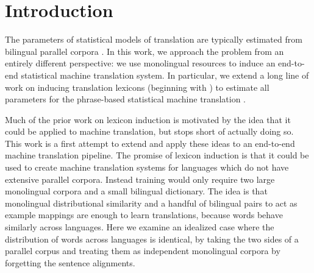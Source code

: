 \documentclass[11pt]{article}
\newcommand{\mnote}[1]{\marginpar{%
  \vskip-\baselineskip
  \raggedright\footnotesize
  \itshape\hrule\smallskip\tiny{#1}\par\smallskip\hrule}}
\newcommand{\mtodo}[1]{\mnote{\textcolor{red}{#1}}}
\begin{document}
\begin{abstract}
\end{abstract}


\section{Introduction} \label{sect:intro}


The parameters of statistical models of translation are typically estimated from bilingual parallel corpora \cite{Brown:1993}. 
In this work, we approach the problem from an entirely different perspective: we use monolingual resources to induce an end-to-end statistical machine translation system.  In particular, we extend a long line of work on inducing translation lexicons (beginning with ) to estimate all parameters for the phrase-based statistical machine translation \cite{Koehn:2003}.


Much of the prior work on lexicon induction is motivated by the idea that it could be applied to machine translation, but stops short of actually doing so.  This work is a first attempt to extend and apply these ideas to an end-to-end machine translation pipeline. 
The promise of lexicon induction is that it could be used to create machine translation systems for languages which do not have extensive parallel corpora.  
Instead training would only require two large monolingual corpora and a small bilingual dictionary.
The idea is that monolingual distributional similarity and a handful of bilingual pairs to act as example mappings are enough to learn translations, because words behave similarly across languages.  Here we examine an idealized case where the distribution of words across languages is identical, by taking the two sides of a parallel corpus and treating them as independent monolingual corpora by forgetting the sentence alignments.
\end{document}
